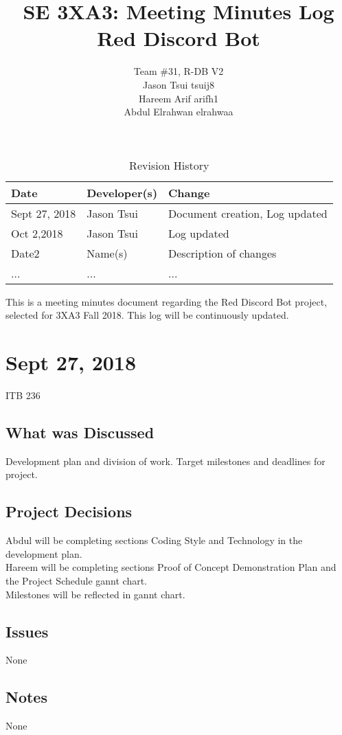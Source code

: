 \documentclass[12pt]{report}
\title{SE 3XA3: Meeting Minutes Log\\Red Discord Bot}
\author{Team \#31, R-DB V2
		\\ Jason Tsui tsuij8
		\\ Hareem Arif arifh1
		\\ Abdul Elrahwan elrahwaa
}
\date{}
\begin{document}
\begin{table}[hp]
\caption{Revision History} \label{TblRevisionHistory}
\begin{tabularx}{\textwidth}{llX}
\toprule
\textbf{Date} & \textbf{Developer(s)} & \textbf{Change}\\
\midrule
Sept 27, 2018 & Jason Tsui & Document creation, Log updated\\
Oct 2,2018 & Jason Tsui & Log updated\\ 
Date2 & Name(s) & Description of changes\\
... & ... & ...\\
\bottomrule
\end{tabularx}
\end{table}




\newpage

\maketitle
This is a meeting minutes document regarding the Red Discord Bot project, selected for 3XA3 Fall 2018. This log will be continuously updated.

\section{Sept 27, 2018}
ITB 236

\subsection{What was Discussed}
Development plan and division of work.
Target milestones and deadlines for project.

\subsection{Project Decisions}
Abdul will be completing sections Coding Style and Technology in the development plan.\\
Hareem will be completing sections Proof of Concept Demonstration Plan and the Project Schedule gannt chart.\\
Milestones will be reflected in gannt chart.

\subsection{Issues}
None

\subsection{Notes}
None
\end{document}

